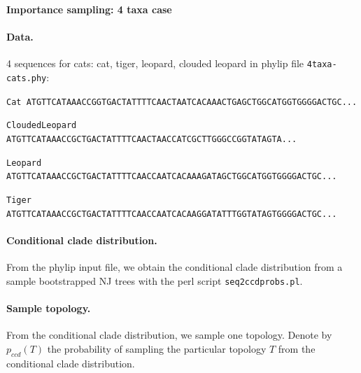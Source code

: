 \documentclass[12pt,letterpaper]{article}
\begin{document}
\begin{center}
\textbf{Importance sampling: 4 taxa case}
\end{center}

\paragraph{Data.} 4 sequences for cats: cat, tiger, leopard, clouded
leopard in phylip file \texttt{4taxa-cats.phy}:

\texttt{Cat ATGTTCATAAACCGGTGACTATTTTCAACTAATCACAAACTGAGCTGGCATGGTGGGGACTGC...}

\texttt{CloudedLeopard ATGTTCATAAACCGCTGACTATTTTCAACTAACCATCGCTTGGGCCGGTATAGTA...}

\texttt{Leopard ATGTTCATAAACCGCTGACTATTTTCAACCAATCACAAAGATAGCTGGCATGGTGGGGACTGC...}

\texttt{Tiger ATGTTCATAAACCGCTGACTATTTTCAACCAATCACAAGGATATTTGGTATAGTGGGGACTGC...}


\paragraph{Conditional clade distribution.} From the phylip input
file, we obtain the conditional clade distribution from a sample bootstrapped
NJ trees with the perl script \texttt{seq2ccdprobs.pl}.

\paragraph{Sample topology.} From the conditional clade distribution, we sample
one topology. Denote by $p_{ccd}(T)$ the probability of sampling the
particular topology $T$ from the conditional clade distribution.
\end{document}
